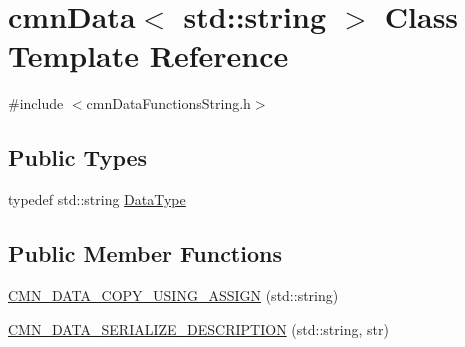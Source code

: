 \hypertarget{classcmn_data_3_01std_1_1string_01_4}{\section{cmn\-Data$<$ std\-:\-:string $>$ Class Template Reference}
\label{classcmn_data_3_01std_1_1string_01_4}
}


{\ttfamily \#include $<$cmn\-Data\-Functions\-String.\-h$>$}

\subsection*{Public Types}
\begin{DoxyCompactItemize}
\item 
typedef std\-::string \hyperlink{classcmn_data_3_01std_1_1string_01_4_a04ffa92a93dc010ed2bf5bf19e2d0fdd}{Data\-Type}
\end{DoxyCompactItemize}
\subsection*{Public Member Functions}
\begin{DoxyCompactItemize}
\item 
\hyperlink{classcmn_data_3_01std_1_1string_01_4_ac1018675a2e4cb7fb35c16f063ca72fa}{C\-M\-N\-\_\-\-D\-A\-T\-A\-\_\-\-C\-O\-P\-Y\-\_\-\-U\-S\-I\-N\-G\-\_\-\-A\-S\-S\-I\-G\-N} (std\-::string)
\item 
\hyperlink{classcmn_data_3_01std_1_1string_01_4_a7206cb10c06ff9bd89ed090c861b8655}{C\-M\-N\-\_\-\-D\-A\-T\-A\-\_\-\-S\-E\-R\-I\-A\-L\-I\-Z\-E\-\_\-\-D\-E\-S\-C\-R\-I\-P\-T\-I\-O\-N} (std\-::string, str)
\end{DoxyCompactItemize}
